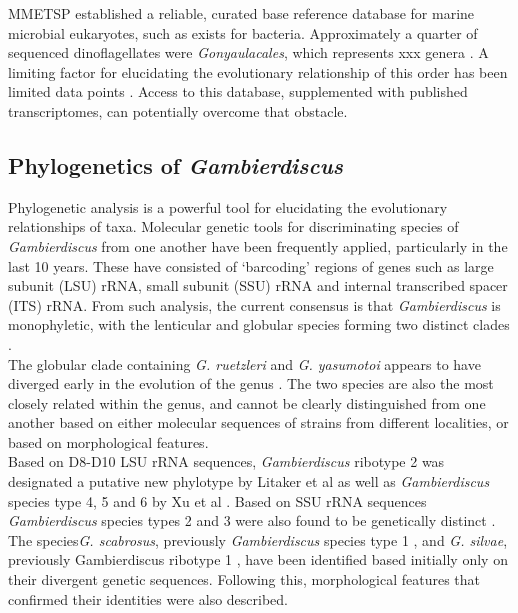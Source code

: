 \documentclass[12pt]{article}
\begin{document}
MMETSP established a reliable, curated base reference database for marine microbial eukaryotes, such as exists for bacteria. Approximately a quarter of sequenced dinoflagellates were \emph{Gonyaulacales}, which represents xxx genera \cite{keeling2014marine}. A limiting factor for elucidating the evolutionary relationship of this order has been limited data points \cite{bachvaroff2014dinoflagellate,gentekaki2014large,orr2012naked}. Access to this database, supplemented with published transcriptomes, can potentially overcome that obstacle. \\ 

\subsection{Phylogenetics of \emph{Gambierdiscus}}

Phylogenetic analysis is a powerful tool for elucidating the evolutionary relationships of taxa. Molecular genetic tools for discriminating species of \emph{Gambierdiscus} from one another have been frequently applied, particularly in the last 10 years. These have consisted of ‘barcoding’ regions of genes such as large subunit (LSU) rRNA, small subunit (SSU) rRNA and internal transcribed spacer (ITS) rRNA. From such analysis, the current consensus is that \emph{Gambierdiscus} is monophyletic, with the lenticular and globular species forming two distinct clades \cite{chinain1999morphology,litaker2009taxonomy,fraga2011gambierdiscus,richlen2008phylogeography,kuno2010genetic,litaker2010global,nishimura2013genetic}. \\

The globular clade containing \emph{G. ruetzleri} and \emph{G. yasumotoi} appears to have diverged early in the evolution of the genus \cite{litaker2009taxonomy,nishimura2013genetic}. The two species are also the most closely related within the genus, and cannot be clearly distinguished from one another based on either molecular sequences of strains from different localities, or based on morphological features. \\

Based on D8-D10 LSU rRNA sequences, \emph{Gambierdiscus} ribotype 2 was designated a putative new phylotype by Litaker et al \cite{litaker2010global} as well as \emph{Gambierdiscus} species type 4, 5 and 6 by Xu et al \cite{xu2014distribution}. Based on SSU rRNA sequences \emph{Gambierdiscus} species types 2 and 3 were also found to be genetically distinct \cite{nishimura2013genetic,kuno2010genetic}. The species\emph{G. scabrosus}, previously \emph{Gambierdiscus} species type 1 \cite{nishimura2013genetic,nishimura2014morphology},  and \emph{G. silvae}, previously Gambierdiscus ribotype 1 \cite{fraga2014genus}, have been identified based initially only on their divergent genetic sequences. Following this, morphological features that confirmed their identities were also described. \\
\end{document}
